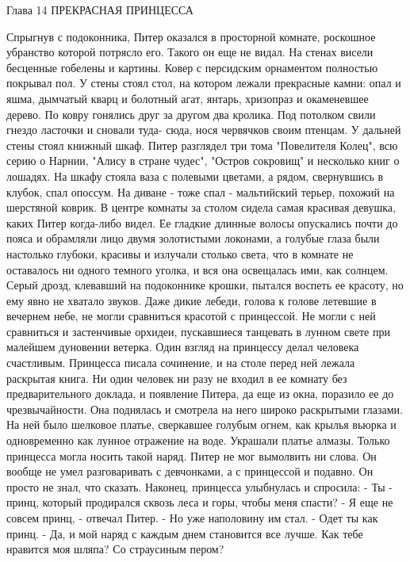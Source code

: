 Глава 14
        ПРЕКРАСНАЯ ПРИНЦЕССА

    Спрыгнув с подоконника, Питер оказался в просторной комнате, 
роскошное убранство которой потрясло его. Такого он еще не видал. На 
стенах висели бесценные гобелены и картины. Ковер с персидским 
орнаментом полностью покрывал пол. У стены стоял стол, на котором 
лежали прекрасные камни: опал и яшма, дымчатый кварц и болотный агат, 
янтарь, хризопраз и окаменевшее дерево. По ковру гонялись друг за 
другом два кролика. Под потолком свили гнездо ласточки и сновали туда-
сюда, нося червячков своим птенцам.
    У дальней стены стоял книжный шкаф. Питер разглядел три тома 
"Повелителя Колец", всю серию о Нарнии, "Алису в стране чудес", 
"Остров сокровищ" и несколько книг о лошадях. На шкафу стояла ваза с 
полевыми цветами, а рядом, свернувшись в клубок, спал опоссум. На 
диване - тоже спал - мальтийский терьер, похожий на шерстяной коврик.
    В центре комнаты за столом сидела самая красивая девушка, каких 
Питер когда-либо видел. Ее гладкие длинные волосы опускались почти до 
пояса и обрамляли лицо двумя золотистыми локонами, а голубые глаза 
были настолько глубоки, красивы и излучали столько света, что в 
комнате не оставалось ни одного темного уголка, и вся она освещалась 
ими, как солнцем.
    Серый дрозд, клевавший на подоконнике крошки, пытался воспеть ее 
красоту, но ему явно не хватало звуков. Даже дикие лебеди, голова к 
голове летевшие в вечернем небе, не могли сравниться красотой с 
принцессой. Не могли с ней сравниться и застенчивые орхидеи, 
пускавшиеся танцевать в лунном свете при малейшем дуновении ветерка.
    Один взгляд на принцессу делал человека счастливым.
    Принцесса писала сочинение, и на столе перед ней лежала раскрытая 
книга. Ни один человек ни разу не входил в ее комнату без 
предварительного доклада, и появление Питера, да еще из окна, поразило 
ее до чрезвычайности. Она поднялась и смотрела на него широко 
раскрытыми глазами. На ней было шелковое платье, сверкавшее голубым 
огнем, как крылья вьюрка и одновременно как лунное отражение на воде. 
Украшали платье алмазы. Только принцесса могла носить такой наряд.
    Питер не мог вымолвить ни слова. Он вообще не умел разговаривать с 
девчонками, а с принцессой и подавно. Он просто не знал, что сказать.
    Наконец, принцесса улыбнулась и спросила:
    - Ты - принц, который продирался сквозь леса и горы, чтобы меня 
спасти?
    - Я еще не совсем принц, - отвечал Питер. - Но уже наполовину им 
стал.
    - Одет ты как принц.
    - Да, и мой наряд с каждым днем становится все лучше. Как тебе 
нравится моя шляпа? Со страусиным пером?
